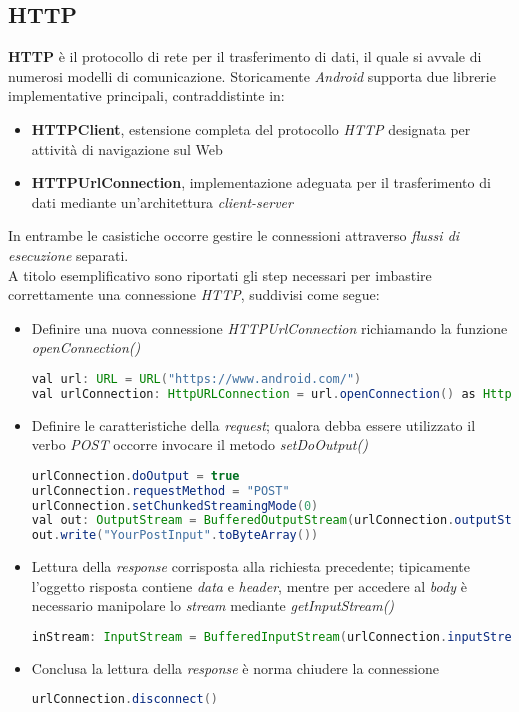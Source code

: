 \documentclass{article}
\begin{document}
\subsection*{HTTP}
\textbf{HTTP} è il protocollo di rete per il trasferimento di dati, il quale si avvale di numerosi modelli di comunicazione. Storicamente \textit{Android} supporta due librerie implementative principali, contraddistinte in:
\begin{itemize}[label={-}]
  \itemsep0em
  \item \textbf{HTTPClient}, estensione completa del protocollo \textit{HTTP} designata per attività di navigazione sul Web
  \item \textbf{HTTPUrlConnection}, implementazione adeguata per il trasferimento di dati mediante un'architettura \textit{client-server}
\end{itemize}
In entrambe le casistiche occorre gestire le connessioni attraverso \textit{flussi di esecuzione} separati.\vspace*{7pt}\\
A titolo esemplificativo sono riportati gli step necessari per imbastire correttamente una connessione \textit{HTTP}, suddivisi come segue:
\begin{itemize}[label={-}]
  \itemsep0em
  \item Definire una nuova connessione \textit{HTTPUrlConnection} richiamando la funzione \textit{openConnection()}
  \begin{lstlisting}[language=JAVA]
val url: URL = URL("https://www.android.com/")
val urlConnection: HttpURLConnection = url.openConnection() as HttpURLConnection
  \end{lstlisting}
  \item Definire le caratteristiche della \textit{request}; qualora debba essere utilizzato il verbo \textit{POST} occorre invocare il metodo \textit{setDoOutput()} 
  \begin{lstlisting}[language=JAVA]
urlConnection.doOutput = true
urlConnection.requestMethod = "POST"
urlConnection.setChunkedStreamingMode(0)
val out: OutputStream = BufferedOutputStream(urlConnection.outputStream)
out.write("YourPostInput".toByteArray())
  \end{lstlisting}
  \item Lettura della \textit{response} corrisposta alla richiesta precedente; tipicamente l'oggetto risposta contiene \textit{data} e \textit{header}, mentre per accedere al \textit{body} è necessario manipolare lo \textit{stream} mediante \textit{getInputStream()}
  \begin{lstlisting}[language=JAVA]
inStream: InputStream = BufferedInputStream(urlConnection.inputStream);
  \end{lstlisting}
  \item Conclusa la lettura della \textit{response} è norma chiudere la connessione 
  \begin{lstlisting}[language=JAVA]
urlConnection.disconnect()
  \end{lstlisting}
\end{itemize}
\end{document}
